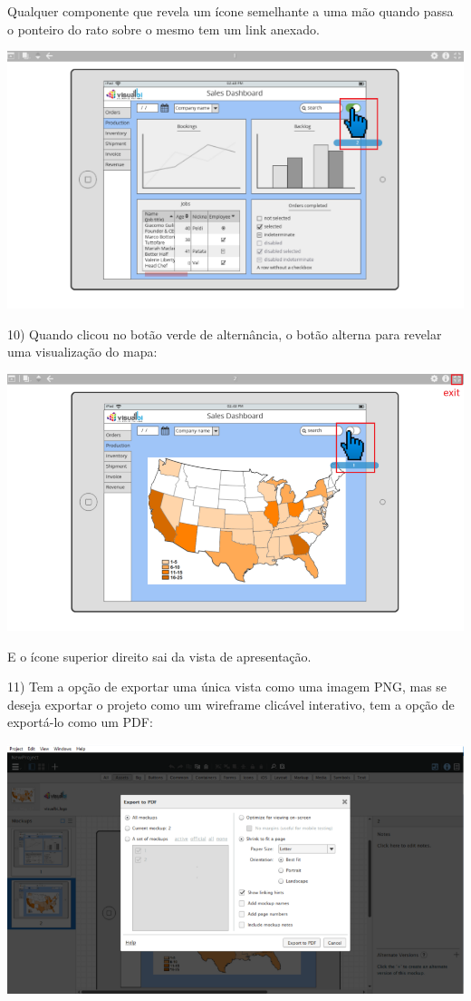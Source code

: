 \documentclass{tufte-book} %
\begin{document}
Qualquer componente que revela um ícone semelhante a uma mão quando passa o ponteiro do rato sobre o mesmo tem um link anexado.

\begin{center}
	\includegraphics{img21.png}
\end{center}

10) Quando clicou no botão verde de alternância, o botão alterna para revelar uma visualização do mapa:

\begin{center}
	\includegraphics{img22.png}
\end{center}

E o ícone superior direito sai da vista de apresentação.

11) Tem a opção de exportar uma única vista como uma imagem PNG, mas se deseja exportar o projeto como um wireframe clicável interativo, tem a opção de exportá-lo como um PDF:

\begin{center}
	\includegraphics{img23.png}
\end{center}
\end{document}
